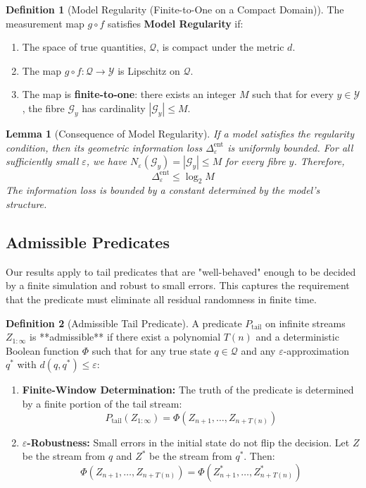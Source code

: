 \documentclass[12pt]{article}
\theoremstyle{definition}
\newtheorem{definition}{Definition}[section]
\theoremstyle{plain}
\newtheorem{lemma}{Lemma}[section]
\begin{document}
\begin{definition}[Model Regularity (Finite-to-One on a Compact Domain)]
The measurement map $g \circ f$ satisfies \textbf{Model Regularity} if:
\begin{enumerate}
    \item The space of true quantities, $\mathcal{Q}$, is compact under the metric $d$.
    \item The map $g \circ f: \mathcal{Q} \to \mathcal{Y}$ is Lipschitz on $\mathcal Q$.
    \item The map is \textbf{finite-to-one}: there exists an integer $M$ such that for every $y \in \mathcal{Y}$, the fibre $\mathcal{G}_y$ has cardinality $|\mathcal{G}_y| \le M$.
\end{enumerate}
\end{definition}

\begin{lemma}[Consequence of Model Regularity]
If a model satisfies the regularity condition, then its geometric information loss $\Delta^{\text{ent}}_\varepsilon$ is uniformly bounded. For all sufficiently small $\varepsilon$, we have $N_\varepsilon(\mathcal{G}_y) = |\mathcal{G}_y| \le M$ for every fibre $y$. Therefore,
\[
\Delta^{\text{ent}}_\varepsilon \le \log_2 M
\]
The information loss is bounded by a constant determined by the model's structure.
\end{lemma}

\subsection{Admissible Predicates}
Our results apply to tail predicates that are "well-behaved" enough to be decided by a finite simulation and robust to small errors. This captures the requirement that the predicate must eliminate all residual randomness in finite time.

\begin{definition}[Admissible Tail Predicate]
A predicate $P_{\mathrm{tail}}$ on infinite streams $Z_{1:\infty}$ is **admissible** if there exist a polynomial $T(n)$ and a deterministic Boolean function $\Phi$ such that for any true state $q \in \mathcal{Q}$ and any $\varepsilon$-approximation $q^*$ with $d(q, q^*) \le \varepsilon$:
\begin{enumerate}
    \item \textbf{Finite-Window Determination:} The truth of the predicate is determined by a finite portion of the tail stream:
    \[
     P_{\mathrm{tail}}(Z_{1:\infty}) = \Phi(Z_{n+1}, \dots, Z_{n+T(n)})
    \]
    \item \textbf{$\varepsilon$-Robustness:} Small errors in the initial state do not flip the decision. Let $Z$ be the stream from $q$ and $Z^*$ be the stream from $q^*$. Then:
    \[
    \Phi(Z_{n+1}, \dots, Z_{n+T(n)}) = \Phi(Z^*_{n+1}, \dots, Z^*_{n+T(n)})
    \]
\end{enumerate}
\end{definition}
\end{document}
